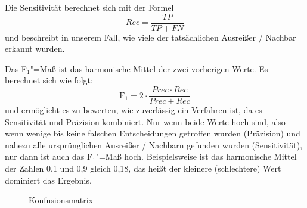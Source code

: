 Die Sensitivität berechnet sich mit der Formel \[Rec = \frac{TP}{TP + FN}\] und beschreibt in unserem Fall, wie viele der tatsächlichen Ausreißer / Nachbar erkannt wurden.

Das F$_1$"=Maß ist das harmonische Mittel der zwei vorherigen Werte. Es berechnet sich wie folgt: \[\text{F}_1=2\cdot\frac{Prec \cdot Rec}{Prec + Rec}\] und ermöglicht es zu bewerten, wie zuverlässig ein Verfahren ist, da es Sensitivität und Präzision kombiniert. Nur wenn beide Werte hoch sind, also wenn wenige bis keine falschen Entscheidungen getroffen wurden (Präzision) und nahezu alle ursprünglichen Ausreißer / Nachbarn gefunden wurden (Sensitivität), nur dann ist auch das F$_1$"=Maß hoch. Beispielsweise ist das harmonische Mittel der Zahlen 0,1 und 0,9 gleich 0,18, das
heißt der kleinere (schlechtere) Wert dominiert das Ergebnis.
\begin{figure}[h]
\centering
 \caption{Konfusionsmatrix}
 \label{fig:konfusionsmatrix}
\end{figure}